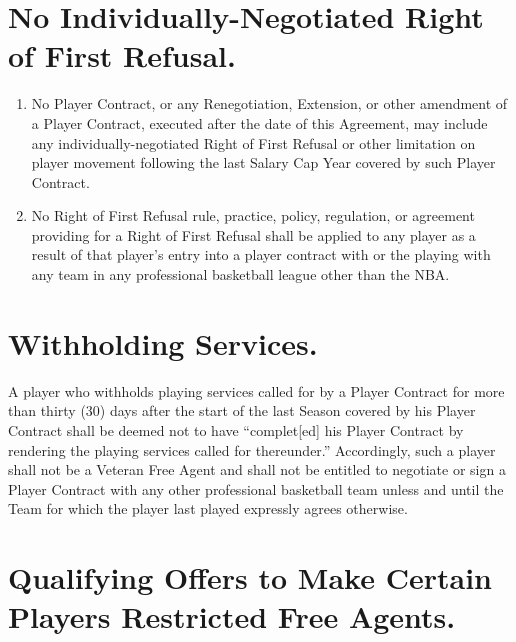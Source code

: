 \documentclass[
]{book}
\providecommand{\tightlist}{%
  \setlength{\itemsep}{0pt}\setlength{\parskip}{0pt}}
\begin{document}
\hypertarget{no-individually-negotiated-right-of-first-refusal.}{%
\section{No Individually-Negotiated Right of First Refusal.}\label{no-individually-negotiated-right-of-first-refusal.}}

\begin{enumerate}
\def\labelenumi{(\alph{enumi})}
\tightlist
\item
  No Player Contract, or any Renegotiation, Extension, or other amendment of a Player Contract, executed after the date of this Agreement, may include any individually-negotiated Right of First Refusal or other limitation on player movement following the last Salary Cap Year covered by such Player Contract.
\item
  No Right of First Refusal rule, practice, policy, regulation, or agreement providing for a Right of First Refusal shall be applied to any player as a result of that player's entry into a player contract with or the playing with any team in any professional basketball league other than the NBA.
\end{enumerate}

\hypertarget{withholding-services.}{%
\section{Withholding Services.}\label{withholding-services.}}

A player who withholds playing services called for by a Player Contract for more than thirty (30) days after the start of the last Season covered by his Player Contract shall be deemed not to have ``complet{[}ed{]} his Player Contract by rendering the playing services called for thereunder.'' Accordingly, such a player shall not be a Veteran Free Agent and shall not be entitled to negotiate or sign a Player Contract with any other professional basketball team unless and until the Team for which the player last played expressly agrees otherwise.

\hypertarget{qualifying-offers-to-make-certain-players-restricted-free-agents.}{%
\section{Qualifying Offers to Make Certain Players Restricted Free Agents.}\label{qualifying-offers-to-make-certain-players-restricted-free-agents.}}
\end{document}
